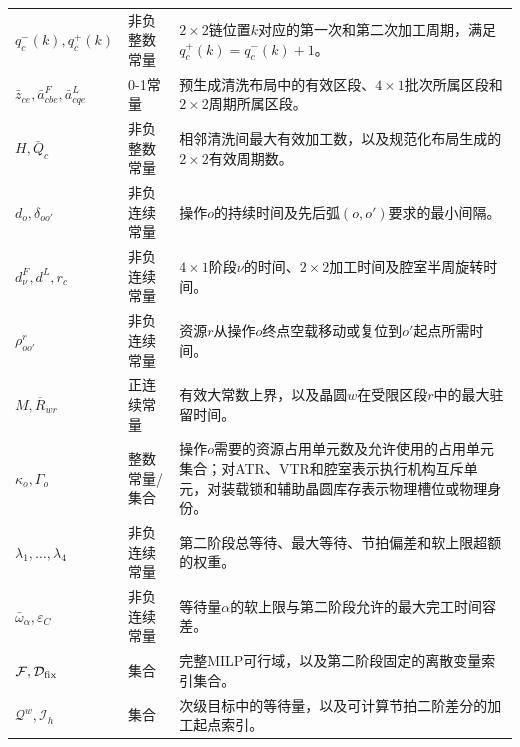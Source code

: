 \documentclass[final,5p,times,twocolumn]{elsarticle}
\begin{document}
\begin{table}[t]
\begin{tabular}{p{}p{}p{}}
$q_c^-(k),q_c^+(k)$ & 非负整数常量 & $2\times2$链位置$k$对应的第一次和第二次加工周期，满足$q_c^+(k)=q_c^-(k)+1$。\\
$\bar z_{ce},\bar a^F_{cbe},\bar a^L_{cqe}$ & 0-1常量 & 预生成清洗布局中的有效区段、$4\times1$批次所属区段和$2\times2$周期所属区段。\\
$H,\bar Q_c$ & 非负整数常量 & 相邻清洗间最大有效加工数，以及规范化布局生成的$2\times2$有效周期数。\\
$d_o,\delta_{oo'}$ & 非负连续常量 & 操作$o$的持续时间及先后弧$(o,o')$要求的最小间隔。\\
$d^F_\nu,d^L,r_c$ & 非负连续常量 & $4\times1$阶段$\nu$的时间、$2\times2$加工时间及腔室半周旋转时间。\\
$\rho^r_{oo'}$ & 非负连续常量 & 资源$r$从操作$o$终点空载移动或复位到$o'$起点所需时间。\\
$M,\overline R_{wr}$ & 正连续常量 & 有效大常数上界，以及晶圆$w$在受限区段$r$中的最大驻留时间。\\
$\kappa_o,\Gamma_o$ & 整数常量/集合 & 操作$o$需要的资源占用单元数及允许使用的占用单元集合；对ATR、VTR和腔室表示执行机构互斥单元，对装载锁和辅助晶圆库存表示物理槽位或物理身份。\\
$\lambda_1,\ldots,\lambda_4$ & 非负连续常量 & 第二阶段总等待、最大等待、节拍偏差和软上限超额的权重。\\
$\bar\omega_\alpha,\varepsilon_C$ & 非负连续常量 & 等待量$\alpha$的软上限与第二阶段允许的最大完工时间容差。\\
$\mathcal F,\mathcal D_{\rm fix}$ & 集合 & 完整MILP可行域，以及第二阶段固定的离散变量索引集合。\\
$\mathcal Q^w,\mathcal I_h$ & 集合 & 次级目标中的等待量，以及可计算节拍二阶差分的加工起点索引。\\
\bottomrule
\end{tabular}
\end{table}
\end{document}
